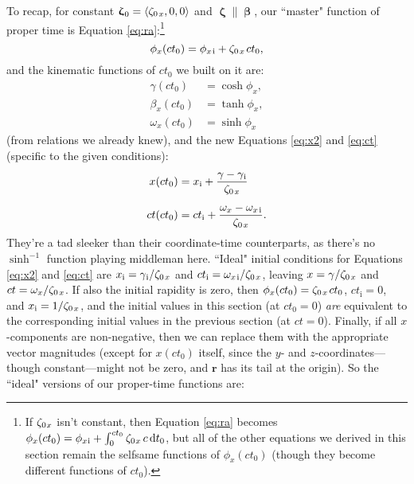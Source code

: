 \documentclass[12pt]{article}
\renewcommand{\vv}[1]{\mathbf{#1}}
\newcommand{\dd}[1]{\mathrm{d}#1}
\newcommand{\vvbeta}{\bm{\upbeta}}
\newcommand{\vvzeta}{\bm{\upzeta}}
\begin{document}
To recap, for constant $\vvzeta_{\mkern1mu 0} = \langle \zeta_{0 \mkern2mu x} , 0, 0 \rangle$ and $\vvzeta \parallel \vvbeta$, our ``master" function of proper time is Equation \ref{eq:ra}:\footnote{If $\zeta_{0 \mkern1mu x}$ isn't constant, then Equation \ref{eq:ra} becomes $\phi_x (ct_0) = \phi_{x \mkern1mu \textrm{i} } + \int_0^{ct_0} \zeta_{0 \mkern1mu x} \, c \, \dd t_0$, but all of the other equations we derived in this section remain the selfsame functions of $\phi_x (ct_0)$ (though they become different functions of $ct_0$).}
\begin{equation*}
\phi_x (ct_0) = \phi_{x \mkern2mu \textrm{i} } + \zeta_{0 \mkern2mu x} \mkern2mu ct_0 ,
\end{equation*}
and the kinematic functions of $ct_0$ we built on it are:
\begin{equation*}
\begin{aligned}
\gamma (ct_0) &= \cosh{\phi_x }  , \\[3pt]
\beta_x (ct_0) &= \tanh{\phi_x }  , \\[3pt]
\omega_x (ct_0) &= \sinh{\phi_x } 
\end{aligned}
\end{equation*}
(from relations we already knew), and the new Equations \ref{eq:x2} and \ref{eq:ct} (specific to the given conditions):
\begin{equation*}
\begin{aligned}
x(ct_0) &= x_{\mathrm{i}} + \dfrac{\gamma - \gamma_{\mkern1mu \mathrm{i}}}{ \zeta_{0 \mkern2mu x}} \\[5pt]
ct(ct_0) &= ct_{\mathrm{i}} + \dfrac{\omega_x - \omega_{x \mkern2mu \textrm{i} }}{ \zeta_{0 \mkern2mu x}} .
\end{aligned}
\end{equation*}
They're a tad sleeker than their coordinate-time counterparts, as there's no $\sinh^{-1}$ function playing middleman here. ``Ideal" initial conditions for Equations \ref{eq:x2} and \ref{eq:ct} are $x_{\mathrm{i}} = \gamma_{\mkern1mu \mathrm{i}} / \zeta_{0 \mkern2mu x}$ and $ct_{\mathrm{i}} = \omega_{x \mkern2mu \textrm{i} } / \zeta_{0 \mkern2mu x}$, leaving $x = \gamma / \zeta_{0 \mkern2mu x}$ and $ct = \omega_x / \zeta_{0 \mkern2mu x}$. If also the initial rapidity is zero, then $\phi_x (ct_0) = \zeta_{0 \mkern2mu x} \mkern2mu ct_0$, $ct_{\mathrm{i}} = 0$, and $x_{\mathrm{i}} = 1 / \zeta_{0 \mkern2mu x}$, and the initial values in this section (at $ct_0 = 0$) \emph{are} equivalent to the corresponding initial values in the previous section (at $ct = 0$). Finally, if all $x$-components are non-negative, then we can replace them with the appropriate vector magnitudes (except for $x (ct_0)$ itself, since the $y$- and $z$-coordinates---though constant---might not be zero, and $\vv r$ has its tail at the origin). So the ``ideal" versions of our proper-time functions are:
\end{document}
